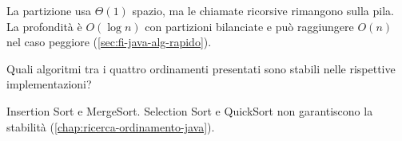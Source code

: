 La partizione usa \(\Theta(1)\) spazio, ma le chiamate ricorsive
rimangono sulla pila. La profondità è \(O(\log n)\) con
partizioni bilanciate e può raggiungere \(O(n)\) nel caso
peggiore (\cref{sec:fi-java-alg-rapido}).

\begin{exercise}
\label{ex:fi-esercizi-java-alg-stabilita}
Quali algoritmi tra i quattro ordinamenti presentati sono
stabili nelle rispettive implementazioni?
\end{exercise}

Insertion Sort e MergeSort. Selection Sort e QuickSort non
garantiscono la stabilità (\cref{chap:ricerca-ordinamento-java}).
